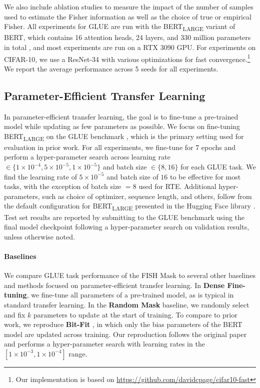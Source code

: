 We also include ablation studies to measure the impact of the number of samples used to estimate the Fisher information as well as the choice of true or empirical Fisher. All experiments for GLUE are run with the BERT\textsubscript{LARGE} variant of BERT, which contains 16 attention heads, 24 layers, and 330 million parameters in total \citep{devlin-etal-2019-bert}, and most experiments are run on a RTX 3090 GPU. For experiments on CIFAR-10, we use a ResNet-34 \citep{DBLP:journals/corr/HeZRS15} with various optimizations for fast convergence.\footnote{Our implementation is based on \url{https://github.com/davidcpage/cifar10-fast}} 
We report the average performance across 5 seeds for all experiments.

\subsection{Parameter-Efficient Transfer Learning} \label{ssec:transfer_learning}

In parameter-efficient transfer learning, the goal is to fine-tune a pre-trained model while updating as few parameters as possible. We focus on fine-tuning BERT\textsubscript{LARGE} on the GLUE benchmark \cite{wang-glue-2018}, which is the primary setting used for evaluation in prior work. For all experiments, we fine-tune for 7 epochs and perform a hyper-parameter search across learning rate $\in \{1 \times 10^{-4}, 5 \times 10^{-5}, 1 \times 10^{-5}\}$ and batch size $\in \{8,16\}$ for each GLUE task. We find the learning rate of $5 \times 10^{-5}$ and batch size of $16$ to be effective for most tasks, with the exception of batch size $= 8$ used for RTE. Additional hyper-parameters, such as choice of optimizer, sequence length, and others, follow from the default configuration for BERT\textsubscript{LARGE} presented in the Hugging Face library \cite{wolf2019huggingface}. Test set results are reported by submitting to the GLUE benchmark using the final model checkpoint following a hyper-parameter search on validation results, unless otherwise noted.

\paragraph{Baselines}

We compare GLUE task performance of the FISH Mask to several other baselines and methods focused on parameter-efficient transfer learning. In \textbf{Dense Fine-tuning}, we fine-tune all parameters of a pre-trained model, as is typical in standard transfer learning. In the \textbf{Random Mask} baseline, we randomly select and fix $k$ parameters to update at the start of training. To compare to prior work, we reproduce \textbf{Bit-Fit} \citep{benzaken2021bitfit}, in which only the bias parameters of the BERT model are updated across training. Our reproduction follows the original paper and performs a hyper-parameter search with learning rates in the $[1 \times 10^{-3}, 1 \times 10^{-4}]$ range.

